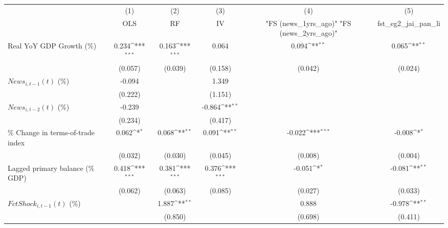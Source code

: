 {
\def\sym#1{\ifmmode^{#1}\else\(^{#1}\)\fi}
\begin{tabular}{l*{5}{c}}
\toprule
                    &\multicolumn{1}{c}{(1)}&\multicolumn{1}{c}{(2)}&\multicolumn{1}{c}{(3)}&\multicolumn{1}{c}{(4)}&\multicolumn{1}{c}{(5)}\\
                    &\multicolumn{1}{c}{OLS}&\multicolumn{1}{c}{RF}&\multicolumn{1}{c}{IV}&\multicolumn{1}{c}{ "FS (news_1yrs_ago)"  "FS (news_2yrs_ago)" }&\multicolumn{1}{c}{fst_eg2_jai_pan_li}\\
\midrule
Real YoY GDP Growth (\%)&       0.234\sym{***}&       0.163\sym{***}&       0.064         &       0.094\sym{**} &       0.065\sym{**} \\
                    &     (0.057)         &     (0.039)         &     (0.158)         &     (0.042)         &     (0.024)         \\
\addlinespace
$ News_{i,t-1}(t)$ (\%)&      -0.094         &                     &       1.349         &                     &                     \\
                    &     (0.222)         &                     &     (1.151)         &                     &                     \\
\addlinespace
$ News_{i,t-2}(t)$ (\%)&      -0.239         &                     &      -0.864\sym{**} &                     &                     \\
                    &     (0.234)         &                     &     (0.417)         &                     &                     \\
\addlinespace
\% Change in terms-of-trade index&       0.062\sym{*}  &       0.068\sym{**} &       0.091\sym{**} &      -0.022\sym{***}&      -0.008\sym{*}  \\
                    &     (0.032)         &     (0.030)         &     (0.045)         &     (0.008)         &     (0.004)         \\
\addlinespace
Lagged primary balance (\% GDP)&       0.418\sym{***}&       0.381\sym{***}&       0.376\sym{***}&      -0.051\sym{*}  &      -0.081\sym{**} \\
                    &     (0.062)         &     (0.063)         &     (0.085)         &     (0.027)         &     (0.033)         \\
\addlinespace
$ FctShock_{i,t-1}(t)$ (\%)&                     &       1.887\sym{**} &                     &       0.888         &      -0.978\sym{**} \\
                    &                     &     (0.850)         &                     &     (0.698)         &     (0.411)         \\

\end{tabular}}
